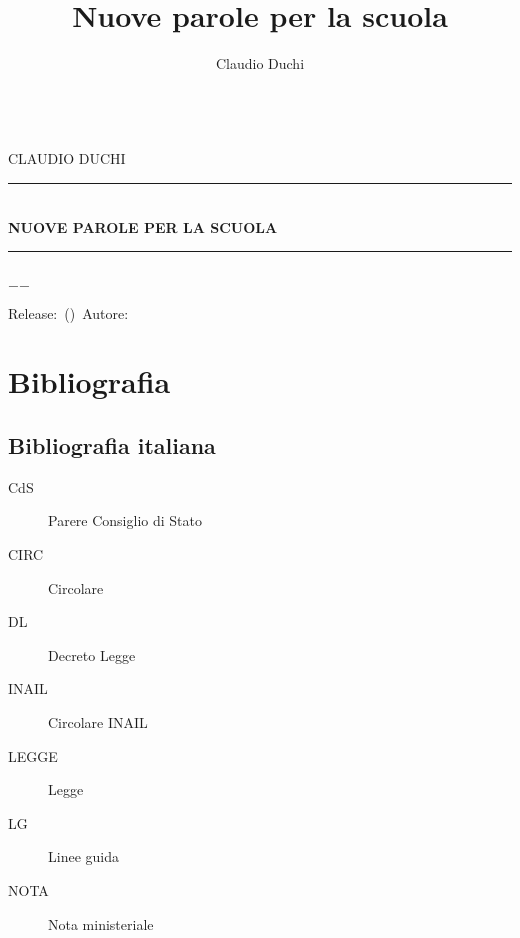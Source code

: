 \documentclass[a4paper]{book}%
\title{Nuove parole per la scuola}
\author{Claudio Duchi}
\date{\datetime}
\makeatletter
\newcommand{\HRule}{\rule{\linewidth}{0.5mm}}
\renewcommand\frontmatter{%
	\cleardoublepage
	\@mainmatterfalse
	\pagenumbering{arabic}}
\renewcommand\mainmatter{%
	\cleardoublepage
	\@mainmattertrue}
\makeatother
\begin{document}
	\pagestyle{fancy}
	\fncyfront
	\frontmatter
		\hypersetup{pageanchor=false}
		\begin{titlepage}\parindent=0pt
			\centering
	\begin{center}
	\Lgrandedue\\[1cm]
	\textsc{\trjnfamily\LARGE CLAUDIO DUCHI}\\[1.2cm]
	\HRule \\[0.4cm]
	{ \trjnfamily\huge \bfseries NUOVE PAROLE PER LA SCUOLA}\\[0.4cm]
	\HRule \\[1.2cm]
	\vfill
	{\large $-$\DTMnow$-$}	
\end{center}
{\centering
	Release:\gitReln\ (\gitAbbrevHash)\ Autore:\gitAuthorName\ 
	\gitCommitterDate \\
}
		\end{titlepage}
	\setcounter{page}{2}
		\CDcopyright
		\tableofcontents
			\listoftables
{}  %
			
	\fncymain
	\mainmatter
\cleardoublepage
\glsaddall	
\printglossaries
	
\nocite{*}



\chapter{Bibliografia}

 \section{Bibliografia italiana}
 \begin{description}
 	\item[CdS] Parere Consiglio di Stato
 	\item[CIRC] Circolare 
 	\item[DL] Decreto Legge
 	\item[INAIL] Circolare INAIL
 	\item[LEGGE] Legge
 	\item[LG] Linee guida
 	\item[NOTA] Nota ministeriale
 \end{description}
\printbibliography[keyword=LEX,heading=subbibliography]
 
\end{document}
